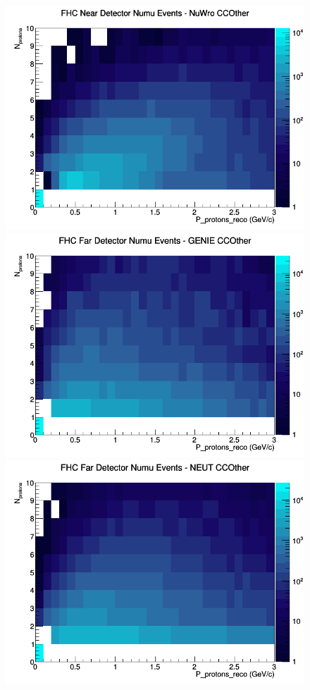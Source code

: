 \documentclass[12pt]{article}
\begin{document}
\begin{figure}[h]
\includegraphics[width=\linewidth]{eff_N_P/FGT/protons/CCOther_FHC_ND_numu_N_P_NuWro.png}
\endminipage
\newline
{}
\includegraphics[width=\linewidth]{eff_N_P/FGT/protons/CCOther_FHC_FD_numu_N_P_GENIE.png}
\endminipage
{}
\includegraphics[width=\linewidth]{eff_N_P/FGT/protons/CCOther_FHC_FD_numu_N_P_NEUT.png}

\end{figure}
\end{document}
